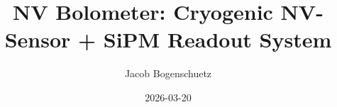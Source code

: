 \documentclass[12pt,letterpaper]{article}
\begin{document}
\title{NV Bolometer: Cryogenic NV-Sensor + SiPM Readout System}
\author{Jacob Bogenschuetz}
\date{2026-03-20}
\maketitle
\tableofcontents
\newpage































\nocite{placeholder_skeleton}


\end{document}
